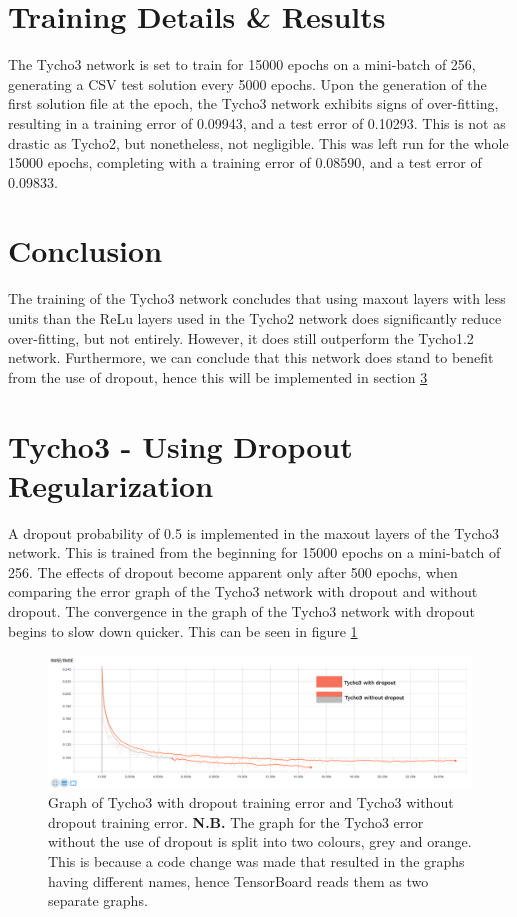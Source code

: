 \documentclass[12pt,a4paper,oneside,oldfontcommands]{memoir}
\begin{document}
\begin{Declaration Of OriginalityOrginality}
\section{Training Details \& Results}

The Tycho3 network is set to train for 15000 epochs on a mini-batch of 256, generating a CSV test solution every 5000 epochs. Upon the generation of the first solution file at the  epoch, the Tycho3 network exhibits signs of over-fitting, resulting in a training error of 0.09943, and a test error of 0.10293. This is not as drastic as Tycho2, but nonetheless, not negligible. This was left run for the whole 15000 epochs, completing with a training error of 0.08590, and a test error of 0.09833.

\section{Conclusion}

The training of the Tycho3 network concludes that using maxout layers with less units than the ReLu layers used in the Tycho2 network does significantly reduce over-fitting, but not entirely. However, it does still outperform the Tycho1.2 network. Furthermore, we can conclude that this network does stand to benefit from the use of dropout, hence this will be implemented in section \ref{tycho3-dropout} 

\section{Tycho3 - Using Dropout Regularization} \label{tycho3-dropout}

A dropout probability of 0.5 is implemented in the maxout layers of the Tycho3 network. This is trained from the beginning for 15000 epochs on a mini-batch of 256. The effects of dropout become apparent only after 500 epochs, when comparing the error graph of the Tycho3 network with dropout and without dropout. The convergence in the graph of the Tycho3 network with dropout begins to slow down quicker. This can be seen in figure \ref{fig:tycho-3-dropout-graph}

\begin{figure}[H]
  \centering
    \includegraphics[width=\linewidth]{images/tycho3vsdropout.png}
    \caption{Graph of Tycho3 with dropout training error and Tycho3 without dropout training error. \textbf{N.B.} The graph for the Tycho3 error without the use of dropout is split into two colours, grey and orange. This is because a code change was made that resulted in the graphs having different names, hence TensorBoard reads them as two separate graphs.}
   \label{fig:tycho-3-dropout-graph}
\end{figure}


\end{Declaration Of OriginalityOrginality}
\end{document}
